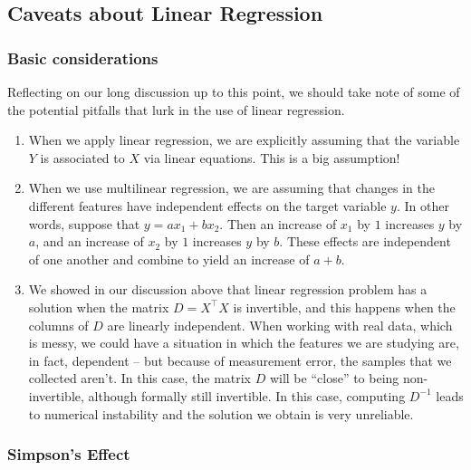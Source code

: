 \documentclass[
]{article}
\begin{document}
\hypertarget{caveats-about-linear-regression}{%
\subsection{Caveats about Linear
Regression}\label{caveats-about-linear-regression}}

\hypertarget{basic-considerations}{%
\subsubsection{Basic considerations}\label{basic-considerations}}

Reflecting on our long discussion up to this point, we should take note
of some of the potential pitfalls that lurk in the use of linear
regression.

\begin{enumerate}
\def\labelenumi{\arabic{enumi}.}
\item
  When we apply linear regression, we are explicitly assuming that the
  variable \(Y\) is associated to \(X\) via linear equations. This is a
  big assumption!
\item
  When we use multilinear regression, we are assuming that changes in
  the different features have independent effects on the target variable
  \(y\). In other words, suppose that \(y=ax_1+bx_2\). Then an increase
  of \(x_1\) by \(1\) increases \(y\) by \(a\), and an increase of
  \(x_2\) by \(1\) increases \(y\) by \(b\). These effects are
  independent of one another and combine to yield an increase of
  \(a+b\).
\item
  We showed in our discussion above that linear regression problem has a
  solution when the matrix \(D=X^{\intercal}X\) is invertible, and this
  happens when the columns of \(D\) are linearly independent. When
  working with real data, which is messy, we could have a situation in
  which the features we are studying are, in fact, dependent -- but
  because of measurement error, the samples that we collected aren't. In
  this case, the matrix \(D\) will be ``close'' to being non-invertible,
  although formally still invertible. In this case, computing \(D^{-1}\)
  leads to numerical instability and the solution we obtain is very
  unreliable.
\end{enumerate}

\hypertarget{simpsons-effect}{%
\subsubsection{Simpson's Effect}\label{simpsons-effect}}
\end{document}
